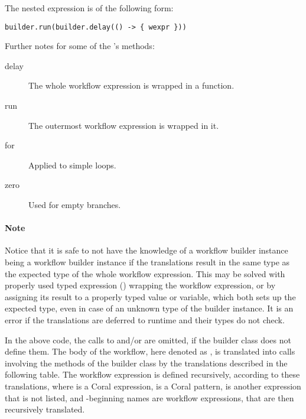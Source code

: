 The nested expression is of the following form: 
\begin{lstlisting}
builder.run(builder.delay(() -> { wexpr }))
\end{lstlisting}

Further notes for some of the 's methods: 
\begin{description}
  \item[delay] The whole workflow expression is wrapped in a function. 
  \item[run] The outermost workflow expression is wrapped in it. 
  \item[for] Applied to simple  loops. 
  \item[zero] Used for empty  branches. 
\end{description}

\paragraph{Note}
Notice that it is safe to not have the knowledge of a workflow builder instance being a workflow builder instance if the translations result in the same type as the expected type of the whole workflow expression. This may be solved with properly used typed expression () wrapping the workflow expression, or by assigning its result to a properly typed value or variable, which both sets up the expected type, even in case of an unknown type of the builder instance. It is an error if the translations are deferred to runtime and their types do not check.

In the above code, the calls to  and/or  are omitted, if the builder class does not define them. The body of the workflow, here denoted as , is translated into calls involving the methods of the builder class by the translations described in the following table. The workflow expression  is defined recursively, according to these translations, where  is a Coral expression,  is a Coral pattern,  is another expression that is not listed, and -beginning names are workflow expressions, that are then recursively translated. 


